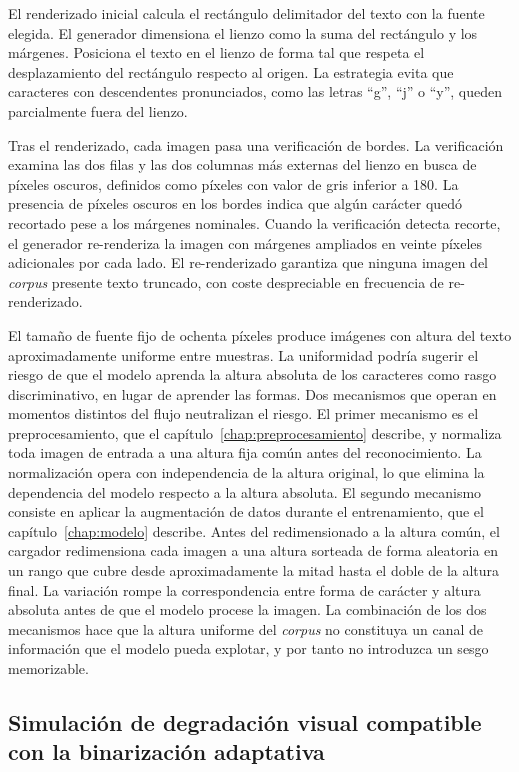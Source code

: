 El renderizado inicial calcula el rectángulo delimitador del texto con la fuente elegida. El generador dimensiona el lienzo como la suma del rectángulo y los márgenes. Posiciona el texto en el lienzo de forma tal que respeta el desplazamiento del rectángulo respecto al origen. La estrategia evita que caracteres con descendentes pronunciados, como las letras ``g'', ``j'' o ``y'', queden parcialmente fuera del lienzo.

Tras el renderizado, cada imagen pasa una verificación de bordes. La verificación examina las dos filas y las dos columnas más externas del lienzo en busca de píxeles oscuros, definidos como píxeles con valor de gris inferior a 180. La presencia de píxeles oscuros en los bordes indica que algún carácter quedó recortado pese a los márgenes nominales. Cuando la verificación detecta recorte, el generador re-renderiza la imagen con márgenes ampliados en veinte píxeles adicionales por cada lado. El re-renderizado garantiza que ninguna imagen del \textit{corpus} presente texto truncado, con coste despreciable en frecuencia de re-renderizado.

El tamaño de fuente fijo de ochenta píxeles produce imágenes con altura del texto aproximadamente uniforme entre muestras. La uniformidad podría sugerir el riesgo de que el modelo aprenda la altura absoluta de los caracteres como rasgo discriminativo, en lugar de aprender las formas. Dos mecanismos que operan en momentos distintos del flujo neutralizan el riesgo. El primer mecanismo es el preprocesamiento, que el capítulo~\ref{chap:preprocesamiento} describe, y normaliza toda imagen de entrada a una altura fija común antes del reconocimiento. La normalización opera con independencia de la altura original, lo que elimina la dependencia del modelo respecto a la altura absoluta. El segundo mecanismo consiste en aplicar la augmentación de datos durante el entrenamiento, que el capítulo~\ref{chap:modelo} describe. Antes del redimensionado a la altura común, el cargador redimensiona cada imagen a una altura sorteada de forma aleatoria en un rango que cubre desde aproximadamente la mitad hasta el doble de la altura final. La variación rompe la correspondencia entre forma de carácter y altura absoluta antes de que el modelo procese la imagen. La combinación de los dos mecanismos hace que la altura uniforme del \textit{corpus} no constituya un canal de información que el modelo pueda explotar, y por tanto no introduzca un sesgo memorizable.

\subsection{Simulación de degradación visual compatible con la binarización adaptativa}
\label{subsec:degradacion}

